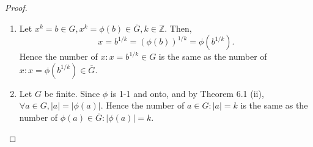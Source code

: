 \documentclass{article}
\newtheorem{theorem}{Theorem}[section]
\theoremstyle{definition}
\begin{document}
\begin{proof}
\begin{enumerate}[label=(\roman*)]
         \item Let $x^k = b \in G, x^k = \phi(b) \in \overline{G}, k \in \mathbb{Z}$. Then,
         \begin{equation*}
             x=b^{1/k} = (\phi(b))^{1/k} = \phi(b^{1/k}). 
         \end{equation*}
         Hence the number of $x: x = b^{1/k} \in G$ is the same as the number of $x: x=\phi(b^{1/k}) \in \overline{G}$.
         
         \item Let $G$ be finite. Since $\phi$ is 1-1 and onto, and by Theorem 6.1 (ii), $\forall a \in G, |a| = |\phi(a)|$. Hence the number of $a \in G: |a| = k$ is the same as the number of $\phi(a) \in \overline{G}: |\phi(a)| = k$.
     \end{enumerate}
 \end{proof}
 
 
\end{document}
